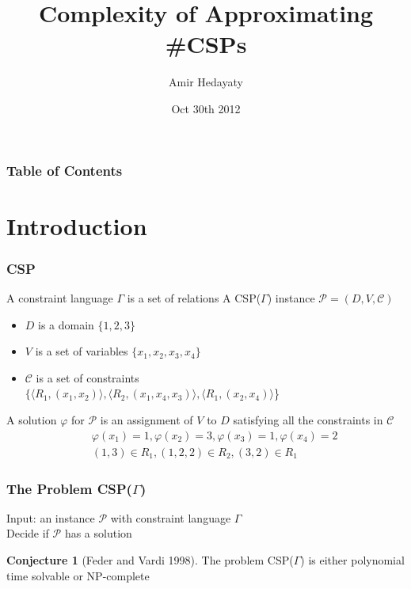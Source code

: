 \documentclass[a4paper,handout]{beamer}
\author{Amir Hedayaty}
\title{Complexity of Approximating \#CSPs}
\institute{Simon Fraser University}
\date{Oct 30th 2012}
\theoremstyle{definition}
\newtheorem{conj}{Conjecture}
\begin{document}
\begin{frame}
\titlepage
\end{frame}

\begin{frame}
\frametitle{Table of Contents}
\tableofcontents
\end{frame}

\section{Introduction}

\begin{frame}
\frametitle{CSP}
A \textcolor{mygreen}{constraint language} \(\Gamma\) is a set of relations
\pause {}
\vskip 12pt
A CSP(\(\Gamma\)) instance \(\mathcal{P} = (D, V, \mathcal{C})\)
\begin{itemize}
\item \(D\) is a domain  {\(\{1,2,3\}\)}
\item \(V\) is a set of variables  {\(\{x_1,x_2,x_3,x_4\}\)}
\item \(\mathcal{C}\) is a set of constraints \\
 {\(\{\langle R_1, (x_1,x_2)\rangle, \langle R_2, (x_1, x_4, x_3)\rangle, \langle R_1, (x_2,x_4) \rangle \)\}}
\end{itemize}
\vskip 12pt
\pause %
\vskip 12pt

\pause
A solution \(\varphi\) for \(\mathcal{P}\) is an assignment of \(V\) to \(D\) satisfying all the constraints in \(\mathcal{C}\)
\pause
\begin{eqnarray*}
&&\varphi(x_1)=1, \varphi(x_2)=3, \varphi(x_3)=1, \varphi(x_4)=2 \\
&&(1,3) \in R_1, (1,2,2) \in R_2, (3,2) \in R_1
\end{eqnarray*}
\end{frame}

\begin{frame}
\frametitle{The Problem CSP(\(\Gamma\))}
\begin{definition} 
Input: an instance \(\mathcal{P}\) with constraint language \(\Gamma\) \\
Decide if \(\mathcal{P}\) has a solution
\end{definition}
\begin{conj} [Feder and Vardi 1998]
The problem CSP(\(\Gamma\)) is either polynomial time solvable or NP-complete
\end{conj}
\end{frame}
\end{document}
